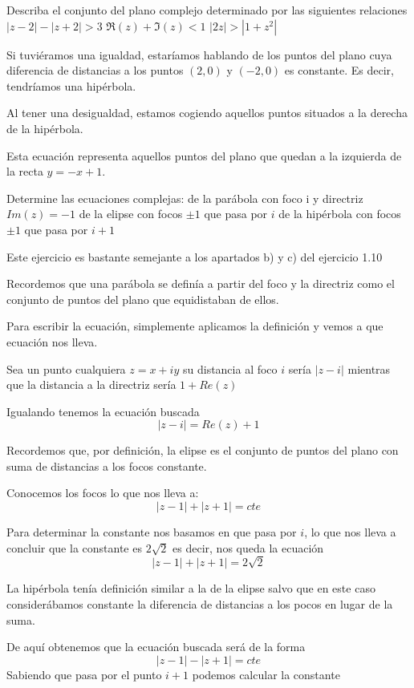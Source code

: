 \begin{problem}[16]
Describa el conjunto del plano complejo determinado por las siguientes relaciones
\ppart$|z-2|-|z+2| > 3$
\ppart$\Re(z)+\Im(z) < 1$
\ppart$|2z|>|1+z^2|$

\solution
{}

\spart
Si tuviéramos una igualdad, estaríamos hablando de los puntos del plano cuya diferencia de distancias a los puntos $(2,0)$ y $(-2,0)$ es constante. Es decir, tendríamos una hipérbola.

Al tener una desigualdad, estamos cogiendo aquellos puntos situados a la derecha de la hipérbola.

\spart

Esta ecuación representa aquellos puntos del plano que quedan a la izquierda de la recta $y=-x+1$.

\spart



\end{problem}

\begin{problem}[17]
Determine las ecuaciones complejas:
\ppart de la parábola con foco i y directriz $Im(z)=-1$
\ppart de la elipse con focos $\pm 1$ que pasa por $i$
\ppart de la hipérbola con focos $\pm 1$ que pasa por $i+1$

\solution

Este ejercicio es bastante semejante a los apartados b) y c) del ejercicio 1.10

\spart
Recordemos que una parábola se definía a partir del foco y la directriz como el conjunto de puntos del plano que equidistaban de ellos.

Para escribir la ecuación, simplemente aplicamos la definición y vemos a que ecuación nos lleva.

Sea un punto cualquiera $z=x+iy$ su distancia al foco $i$ sería $|z-i|$ mientras que la distancia a la directriz sería $1+Re(z)$

Igualando tenemos la ecuación buscada
\[|z-i|=Re(z)+1\]

\spart
Recordemos que, por definición, la elipse es el conjunto de puntos del plano con suma de distancias a los focos constante.

Conocemos los focos lo que nos lleva a:
\[|z-1|+|z+1|=cte\]

Para determinar la constante nos basamos en que pasa por $i$, lo que nos lleva a concluir que la constante es $2\sqrt{2}$ es decir, nos queda la ecuación
\[|z-1|+|z+1|=2\sqrt{2}\]

\spart
La hipérbola tenía definición similar a la de la elipse salvo que en este caso considerábamos constante la diferencia de distancias a los pocos en lugar de la suma.

De aquí obtenemos que la ecuación buscada será de la forma
\[|z-1|-|z+1|=cte\]
Sabiendo que pasa por el punto $i+1$ podemos calcular la constante

\end{problem}

